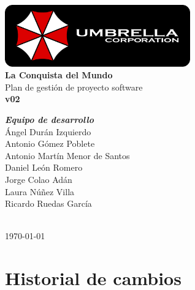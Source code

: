 \documentclass[a4paper,11pt,oneside]{report}
\begin{document}
\renewcommand\listtablename{Índice de tablas}
\renewcommand\tablename{Tabla}

\pagestyle{plain}



\begin{titlepage}
\begin{center}

\includegraphics[width=0.6\textwidth]{logo-umbrella.png}\\[4cm]

{\huge \textbf{La Conquista del Mundo}}\\[0.5cm]
{\huge {Plan de gestión de proyecto software}}\\[0.5cm]
{\Large \textbf{v02}}\\[4cm]

\begin{minipage}{0.5\textwidth}
\large
\hspace{1cm}\textbf{\emph{Equipo de desarrollo}}\\
Ángel Durán Izquierdo\\
Antonio Gómez Poblete\\
Antonio Martín Menor de Santos\\
Daniel León Romero\\
Jorge Colao Adán\\
Laura Núñez Villa\\
Ricardo Ruedas García\\
\end{minipage}\\[2cm]

{\Large \today}
\end{center}
\end{titlepage}


\clearpage
{}

\chapter*{Historial de cambios}
\setcounter{page}{2}
\end{document}
